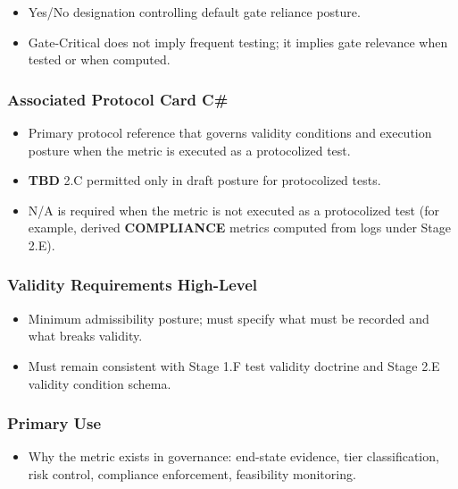\documentclass[10pt]{article}
\begin{document}
\begin{itemize}
\item Yes/No designation controlling default gate reliance posture.
\item Gate-Critical does not imply frequent testing; it implies gate relevance when tested or when computed.
\end{itemize}

\subsubsection*{Associated Protocol Card C\#}

\begin{itemize}
\item Primary protocol reference that governs validity conditions and execution posture when the metric is executed as a protocolized test.
\item \textbf{TBD} 2.C permitted only in draft posture for protocolized tests.
\item N/A is required when the metric is not executed as a protocolized test (for example, derived \textbf{COMPLIANCE} metrics computed from logs under Stage 2.E).
\end{itemize}

\subsubsection*{Validity Requirements High-Level}

\begin{itemize}
\item Minimum admissibility posture; must specify what must be recorded and what breaks validity.
\item Must remain consistent with Stage 1.F test validity doctrine and Stage 2.E validity condition schema.
\end{itemize}

\subsubsection*{Primary Use}

\begin{itemize}
\item Why the metric exists in governance: end-state evidence, tier classification, risk control, compliance enforcement, feasibility monitoring.
\end{itemize}
\end{document}
